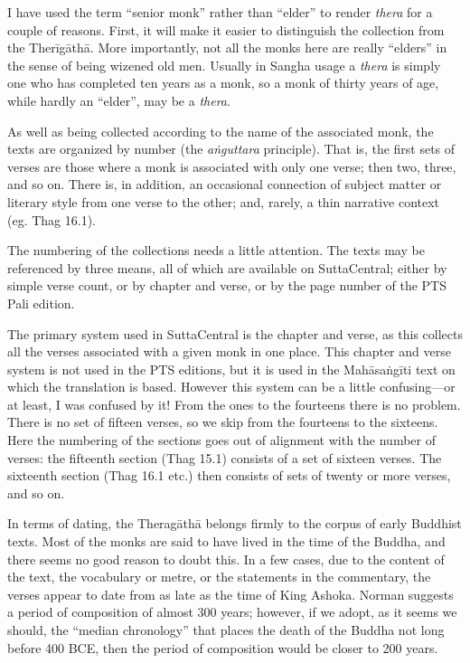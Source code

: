 \documentclass[12pt,openany]{book}%
\begin{document}
I have used the term “senior monk” rather than “elder” to render \textit{thera} for a couple of reasons. First, it will make it easier to distinguish the collection from the \textsanskrit{Therīgāthā}. More importantly, not all the monks here are really “elders” in the sense of being wizened old men. Usually in Sangha usage a \textit{thera} is simply one who has completed ten years as a monk, so a monk of thirty years of age, while hardly an “elder”, may be a \textit{thera}.

As well as being collected according to the name of the associated monk, the texts are organized by number (the \textit{\textsanskrit{aṅguttara}} principle). That is, the first sets of verses are those where a monk is associated with only one verse; then two, three, and so on. There is, in addition, an occasional connection of subject matter or literary style from one verse to the other; and, rarely, a thin narrative context (eg. Thag 16.1).

The numbering of the collections needs a little attention. The texts may be referenced by three means, all of which are available on SuttaCentral; either by simple verse count, or by chapter and verse, or by the page number of the PTS Pali edition.

The primary system used in SuttaCentral is the chapter and verse, as this collects all the verses associated with a given monk in one place. This chapter and verse system is not used in the PTS editions, but it is used in the \textsanskrit{Mahāsaṅgīti} text on which the translation is based. However this system can be a little confusing—or at least, I was confused by it! From the ones to the fourteens there is no problem. There is no set of fifteen verses, so we skip from the fourteens to the sixteens. Here the numbering of the sections goes out of alignment with the number of verses: the fifteenth section (Thag 15.1) consists of a set of sixteen verses. The sixteenth section (Thag 16.1 etc.) then consists of sets of twenty or more verses, and so on.

In terms of dating, the \textsanskrit{Theragāthā} belongs firmly to the corpus of early Buddhist texts. Most of the monks are said to have lived in the time of the Buddha, and there seems no good reason to doubt this. In a few cases, due to the content of the text, the vocabulary or metre, or the statements in the commentary, the verses appear to date from as late as the time of King Ashoka. Norman suggests a period of composition of almost 300 years; however, if we adopt, as it seems we should, the “median chronology” that places the death of the Buddha not long before 400 BCE, then the period of composition would be closer to 200 years.
\end{document}
